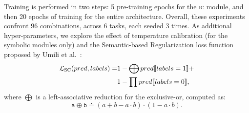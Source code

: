 Training is performed in two steps: 5 pre-training epochs for the \textsc{ic} module, and then 20 epochs of training for the entire architecture. Overall, these experiments confront 96 combinations, across 6 tasks, each seeded 3 times.
%
As additional hyper-parameters, we explore the effect of temperature calibration (for the symbolic modules only) and the Semantic-based Regularization loss function proposed by Umili et al.~\cite{umili2023grounding}:
\begin{align*}
	{\mathcal{L}}_{\textsc{SC}}(pred, labels) = &1 - \bigoplus pred\llbracket labels = 1 \rrbracket +\\
	& 1 - \prod pred \llbracket labels = 0 \rrbracket,
\end{align*}
where $\bigoplus$ is a left-associative reduction for the exclusive-or, computed as:
$$\texttt{a} \oplus \texttt{b} \doteq (a + b - a \cdot b) \cdot (1 - a \cdot b).$$

